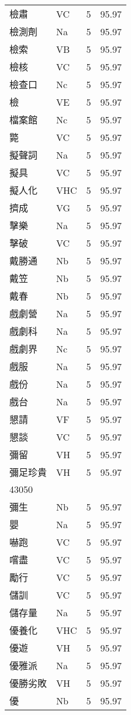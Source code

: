 \documentclass[twocolumn]{book}
\begin{document}
\begin{supertabular}{llrr}
檢肅 & VC & 5 &  95.97\\
檢測劑 & Na & 5 &  95.97\\
檢索 & VB & 5 &  95.97\\
檢核 & VC & 5 &  95.97\\
檢查口 & Nc & 5 &  95.97\\
檢 & VE & 5 &  95.97\\
檔案館 & Nc & 5 &  95.97\\
斃 & VC & 5 &  95.97\\
擬聲詞 & Na & 5 &  95.97\\
擬具 & VC & 5 &  95.97\\
擬人化 & VHC & 5 &  95.97\\
擠成 & VG & 5 &  95.97\\
擊樂 & Na & 5 &  95.97\\
擊破 & VC & 5 &  95.97\\
戴勝通 & Nb & 5 &  95.97\\
戴笠 & Nb & 5 &  95.97\\
戴春 & Nb & 5 &  95.97\\
戲劇營 & Na & 5 &  95.97\\
戲劇科 & Na & 5 &  95.97\\
戲劇界 & Nc & 5 &  95.97\\
戲服 & Na & 5 &  95.97\\
戲份 & Na & 5 &  95.97\\
戲台 & Na & 5 &  95.97\\
懇請 & VF & 5 &  95.97\\
懇談 & VC & 5 &  95.97\\
彌留 & VH & 5 &  95.97\\
彌足珍貴 & VH & 5 &  95.97\\
43050\\
彌生 & Nb & 5 &  95.97\\
嬰 & Na & 5 &  95.97\\
嚇跑 & VC & 5 &  95.97\\
嚐盡 & VC & 5 &  95.97\\
勵行 & VC & 5 &  95.97\\
儲訓 & VC & 5 &  95.97\\
儲存量 & Na & 5 &  95.97\\
優養化 & VHC & 5 &  95.97\\
優遊 & VH & 5 &  95.97\\
優雅派 & Na & 5 &  95.97\\
優勝劣敗 & VH & 5 &  95.97\\
優 & Nb & 5 &  95.97\\

\end{supertabular}
\end{document}
